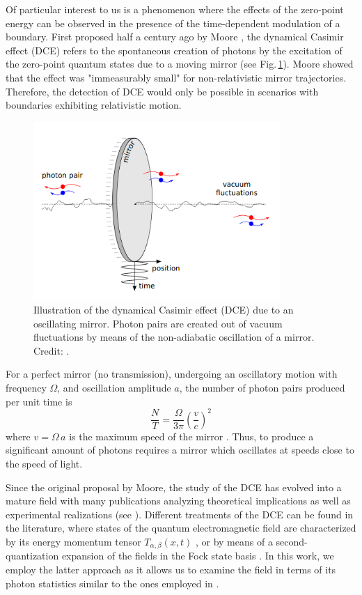 Of particular interest to us is a phenomenon where the effects of the zero-point energy can be observed in the presence of the time-dependent modulation of a boundary. First proposed half a century ago by Moore \cite{Moore1970}, the dynamical Casimir effect (DCE) refers to the spontaneous creation of photons by the excitation of the zero-point quantum states due to a moving mirror (see Fig.\,\ref{fig:Nation_movingmiror}). Moore showed that the effect was "immeasurably small" for non-relativistic mirror trajectories. Therefore, the detection of DCE would only be possible in scenarios with boundaries exhibiting relativistic motion.
%
\begin{figure}
    \includegraphics[width = 3.7in, keepaspectratio]{figures/intro/Nation2011_DCE.png}
    \caption{Illustration of the dynamical Casimir effect (DCE) due to an oscillating mirror. 
    Photon pairs are created out of vacuum fluctuations by means of the non-adiabatic oscillation of a mirror. Credit: \protect\cite{Nation2011}.}
    \label{fig:Nation_movingmiror}
\end{figure}
\newpage
\noindent
For a perfect mirror (no transmission), undergoing an oscillatory motion with frequency $\Omega$, and oscillation amplitude $a$, 
the number of photon pairs produced per unit time is
%
\begin{equation}
    \frac{N}{T} = \frac{\Omega}{3\pi}\left(\frac{v}{c}\right)^2 
\end{equation}
%
where $v = \Omega \, a$ is the maximum speed of the mirror \cite{Lambrecht1996}. Thus, to produce a significant amount of photons requires
a mirror which oscillates at speeds close to the speed of light.

Since the original proposal by Moore, the study of the DCE has evolved into a mature field with many publications analyzing theoretical implications as well as experimental realizations (see \cite{Dodonov_Review2020}). Different treatments of the DCE can be found in the literature, where states of the quantum electromagnetic field are characterized by its energy momentum tensor $T_{\alpha, \beta}(x,t)$ \cite{Fulling&Davies1976}, or by means of a second-quantization expansion of the fields in the Fock state basis \cite{Dodonov1990}. In this work, we employ the latter approach as it allows us to examine the field in terms of its photon statistics similar to the ones employed in \cite{Dodonov1990,Lambrecht1996, Nation2011}.

